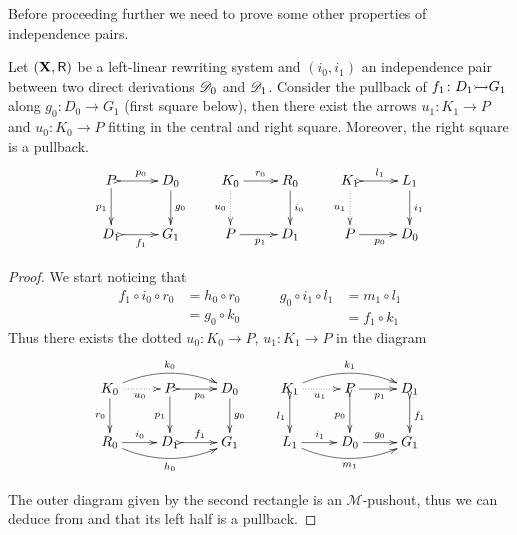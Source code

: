 Before proceeding further we need to prove some other properties of independence pairs.

\begin{proposition}
	\label{prop:tec}
	Let $(\textbf {\textup{X}},\mathsf{R})$ be a left-linear rewriting system and
	$(i_0, i_1)$ an independence pair between two direct
	derivations $\mathscr{D}_0$ and $\mathscr{D}_1$. Consider the pullback of
	$f_1\colon D_1\mto G_1$ along $g_0\colon D_0\to G_1$ (first
	square below), then there exist the arrows
	$u_1\colon K_1\to P$ and $u_0\colon K_0\to P$ fitting in the
	central and right square. Moreover, the right square is a pullback.
	\[\xymatrix{P \ar@{>->}[r]^{p_0} \ar[d]_{p_1} & D_0
		\ar[d]^{g_0}& K_0 \ar[r]^{r_0} \ar@{.>}[d]_{u_0}& R_0
		\ar[d]^{i_0} & K_1 \ar@{>->}[r]^{l_1} \ar@{.>}[d]_{u_1}&
		L_1 \ar[d]^{i_1}\\ D_1 \ar@{>->}[r]_{f_1} &G_1 &P
		\ar[r]_{p_1} & D_1 &P \ar[r]_{p_0} & D_0}
	\]
\end{proposition}

\begin{proof}
	We start noticing that
	\[\begin{split}
		f_1\circ i_0\circ r_0&=h_0\circ r_0\\&=g_0\circ k_0	\end{split}
	\qquad\begin{split}
		g_0\circ i_1\circ l_1&=m_1\circ l_1\\&= f_1 \circ k_1
	\end{split}
	\]
	Thus there exists the dotted $u_0\colon K_0\to P$,
	$u_1\colon K_1\to P$ in the diagram
	\[\xymatrix{K_0 \ar[d]_{r_0}
		\ar@{.>}[r]_{u_0}\ar@/^.4cm/[rr]^{k_0} &P
		\ar@{>->}[r]_{p_0} \ar[d]_{p_1}& D_0 \ar[d]^{g_0}&K_1
		\ar@{>->}[d]_{l_1}
		\ar@{.>}[r]_{u_1}\ar@/^.4cm/[rr]^{k_1} &P \ar[r]_{p_1}
		\ar@{>->}[d]_{p_0}& D_1 \ar@{>->}[d]^{f_1}\\R_0
		\ar@/_.4cm/[rr]_{h_0}\ar[r]^{i_0}& D_1
		\ar@{>->}[r]^{f_1}& G_1&L_1
		\ar@/_.4cm/[rr]_{m_1}\ar[r]^{i_1}& D_0 \ar[r]^{g_0}&
		G_1}\]		
		
The outer diagram given by the second rectangle is an $\mathcal{M}$-pushout, thus we can deduce from  and  that its left half is a pullback.
\end{proof}

